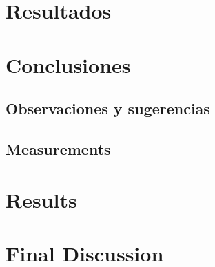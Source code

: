 \documentclass[a4paper,12pt]{article}
\begin{document}
\section{Resultados}

\section{Conclusiones}

\subsection{Observaciones y sugerencias}

\subsection{Measurements}

\section{Results}

\section{Final Discussion}

\printbibliography
\end{document}
